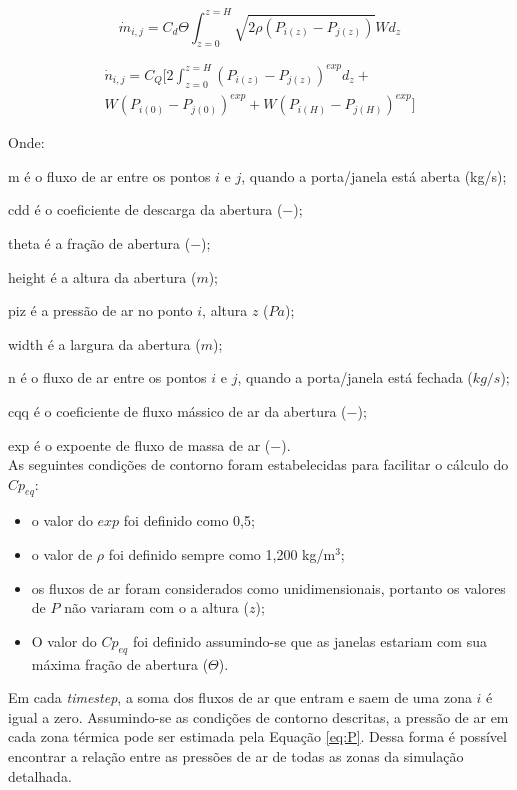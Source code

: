 \documentclass[brazil,hardcopy,openany]{ufscthesis} %
\begin{document}
\begin{equation}
\label{eq:AFEDOP_opened}
\dot{m}_{i,j} = C_d \Theta 	\int_{z=0}^{z=H} \sqrt{2 \rho (P_{i(z)} - P_{j(z)})} W d_z 
\end{equation}

\begin{equation}
\label{eq:AFEDOP_closed}
\begin{split}
\dot{n}_{i,j} = C_Q [2\int_{z=0}^{z=H} {(P_{i(z)} - P_{j(z)})}^{exp} d_z + \\ W{(P_{i(0)} - P_{j(0)})}^{exp} + W{(P_{i(H)} - P_{j(H)})}^{exp}]
\end{split}
\end{equation}

Onde:

\gls{m} é o fluxo de ar entre os pontos $i$ e $j$, quando a porta/janela está aberta (kg/s);

\gls{cdd} é o coeficiente de descarga da abertura ($-$);

\gls{theta} é a fração de abertura ($-$);

\gls{height} é a altura da abertura ($m$);

\gls{piz} é a pressão de ar no ponto $i$, altura $z$ ($Pa$);

\gls{width} é a largura da abertura ($m$);

\gls{n} é o fluxo de ar entre os pontos $i$ e $j$, quando a porta/janela está fechada ($kg/s$);

\gls{cqq} é o coeficiente de fluxo mássico de ar da abertura ($-$);

\gls{exp} é o expoente de fluxo de massa de ar ($-$).
\\

As seguintes condições de contorno foram estabelecidas para facilitar o cálculo do $Cp_{eq}$:
\begin{itemize}			 
	\item o valor do $exp$ foi definido como 0,5;
	\item o valor de $\rho$ foi definido sempre como 1,200 kg/m$^3$;
	\item os fluxos de ar foram considerados como unidimensionais, portanto os valores de $P$ não variaram com o a altura ($z$);
	\item O valor do $Cp_{eq}$ foi definido assumindo-se que as janelas estariam com sua máxima fração de abertura ($\Theta$).
\end{itemize}

Em cada \textit{timestep}, a soma dos fluxos de ar que entram e saem de uma zona $i$ é igual a zero. Assumindo-se as condições de contorno descritas, a pressão de ar em cada zona térmica pode ser estimada pela Equação \ref{eq:P}. Dessa forma é possível encontrar a relação entre as pressões de ar de todas as zonas da simulação detalhada.
\end{document}
